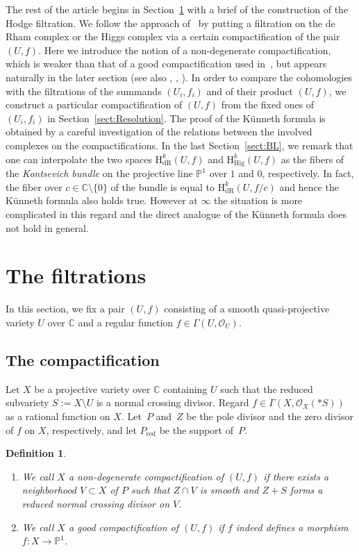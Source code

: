 \documentclass[11pt]{article}
\newcommand{\CC}{\mathbb{C}}
\newcommand{\PP}{\mathbb{P}}
\newcommand{\sO}{\mathscr{O}}
\newcommand{\dR}{\mathrm{dR}}
\newcommand{\Hig}{\mathrm{Hig}}
\newcommand{\coH}{\mathrm{H}}
\newcommand{\cpt}{compactification}
\newcommand{\red}[1]{{#1}_{\mathrm{red}}}
\newtheorem*{definition*}{Definition}
\begin{document}
The rest of the article begins in Section~\ref{sect:Fil} with a brief of the construction of the Hodge filtration. We follow the approach of~\cite{Y} by putting a filtration on the de Rham complex or the Higgs complex via a certain {\cpt} of the pair $(U,f)$. Here we introduce the notion of a non-degenerate {\cpt}, which is weaker than that of a good {\cpt} used in~\cite{Y}, but appears naturally in the later section (see also \cite[Section~4]{S}, \cite[Section~7.3]{SY}, \cite{M_GKZ}). In order to compare the cohomologies with the filtrations of the summands $(U_i,f_i)$ and of their product $(U,f)$, we construct a particular {\cpt} of $(U,f)$
from the fixed ones of $(U_i,f_i)$ in Section~\ref{sect:Resolution}. The proof of the K\"unneth formula is obtained by a careful investigation of the relations between the involved complexes on the {\cpt}s. In the last Section~\ref{sect:BL}, we remark that one can interpolate the two spaces $\coH_\dR^k(U,f)$ and $\coH_\Hig^k(U,f)$ as the fibers of the \textit{Kontsevich bundle} on the projective line $\PP^1$ over $1$ and $0$, respectively.
In fact, the fiber over $c\in \CC\setminus \{0\}$ of the bundle is equal to $\coH_\dR^k(U,f/c)$ and hence the K\"unneth formula also holds true. However at $\infty$ the situation is more complicated in this regard and the direct analogue of the K\"unneth formula does not hold in general.

\section{The filtrations}\label{sect:Fil}

In this section, we fix a pair $(U,f)$ consisting of a smooth quasi-projective variety $U$ over $\CC$ and a regular function $f\in\Gamma(U,\sO_U)$.

\subsection{The \cpt}
Let $X$ be a projective variety over $\CC$ containing $U$ such that the reduced subvariety $S := X\setminus U$ is a normal crossing divisor. Regard $f\in\Gamma(X,\sO_X(*S))$ as a rational function on $X$. Let~$P$ and~$Z$ be the pole divisor and the zero divisor of $f$ on $X$, respectively, and let $\red{P}$ be the support of~$P$.

\begin{definition*}\quad\begin{enumerate}\itemsep=0pt
\item[(i)] We call $X$ a \textit{non-degenerate {\cpt}} of $(U,f)$ if there exists a neighborhood $V \subset X$ of $P$ such that $Z\cap V$ is smooth and $Z+S$ forms a reduced normal crossing divisor on $V$.

\item[(ii)] We call $X$ a \textit{good {\cpt}} of $(U,f)$ if $f$ indeed defines a morphism $f\colon X \to \PP^1$.
\end{enumerate}
\end{definition*}
\end{document}
